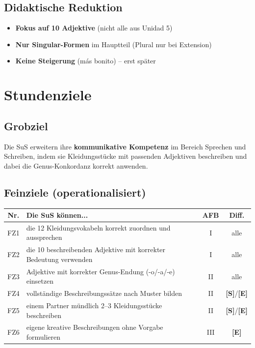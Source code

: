 \documentclass[11pt,a4paper]{article}
\newcommand{\standard}{\textcolor{standardblue}{\textbf{[S]}}}
\newcommand{\erweiterung}{\textcolor{erweiterungpurple}{\textbf{[E]}}}
\begin{document}
\subsection{Didaktische Reduktion}
\begin{itemize}
    \item \textbf{Fokus auf 10 Adjektive} (nicht alle aus Unidad 5)
    \item \textbf{Nur Singular-Formen} im Hauptteil (Plural nur bei Extension)
    \item \textbf{Keine Steigerung} (más bonito) -- erst später
\end{itemize}

\section{Stundenziele}

\subsection{Grobziel}
Die SuS erweitern ihre \textbf{kommunikative Kompetenz} im Bereich Sprechen und Schreiben, indem sie Kleidungsstücke mit passenden Adjektiven beschreiben und dabei die Genus-Konkordanz korrekt anwenden.

\subsection{Feinziele (operationalisiert)}
\begin{tabular}{|c|p{7cm}|c|c|}
\hline
\textbf{Nr.} & \textbf{Die SuS können...} & \textbf{AFB} & \textbf{Diff.} \\
\hline
FZ1 & die 12 Kleidungsvokabeln korrekt zuordnen und aussprechen & I & alle \\
\hline
FZ2 & die 10 beschreibenden Adjektive mit korrekter Bedeutung verwenden & I & alle \\
\hline
FZ3 & Adjektive mit korrekter Genus-Endung (-o/-a/-e) einsetzen & II & alle \\
\hline
FZ4 & vollständige Beschreibungssätze nach Muster bilden & II & \standard{}/\erweiterung{} \\
\hline
FZ5 & einem Partner mündlich 2--3 Kleidungsstücke beschreiben & II & \standard{}/\erweiterung{} \\
\hline
FZ6 & eigene kreative Beschreibungen ohne Vorgabe formulieren & III & \erweiterung{} \\
\hline
\end{tabular}
\end{document}
